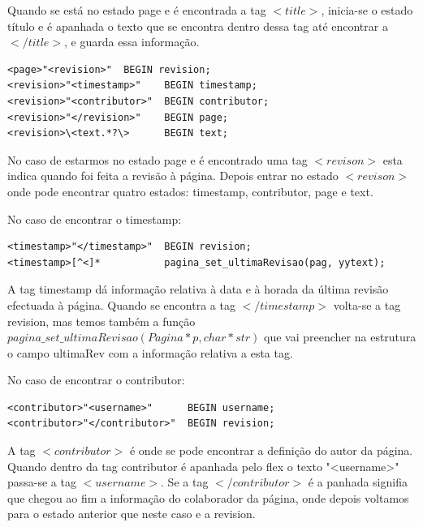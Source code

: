 \documentclass[11pt, a4paper, oneside]{article}
\begin{document}
Quando se está no estado page e é encontrada a tag \begin{math}<title>\end{math}, inicia-se o estado título e é apanhada o texto que se encontra dentro dessa tag até encontrar a \begin{math}</title>\end{math}, e guarda essa informação.


\begin{verbatim}
<page>"<revision>"  BEGIN revision;
<revision>"<timestamp>"    BEGIN timestamp;
<revision>"<contributor>"  BEGIN contributor;
<revision>"</revision>"    BEGIN page;
<revision>\<text.*?\>      BEGIN text;
\end{verbatim}


No caso de estarmos no estado page e é encontrado uma tag \begin{math}<revison>\end{math} esta indica quando foi feita a revisão à página. Depois entrar no estado \begin{math}<revison>\end{math} onde pode encontrar quatro estados: timestamp, contributor, page e text.

No caso de encontrar o timestamp:
\begin{verbatim}
<timestamp>"</timestamp>"  BEGIN revision;
<timestamp>[^<]*           pagina_set_ultimaRevisao(pag, yytext);
\end{verbatim}

A tag timestamp dá informação relativa à data e à horada da última revisão efectuada à página.
Quando se encontra a tag \begin{math}</timestamp>\end{math}  volta-se a tag revision, mas  temos também a função\begin{math}pagina\_set\_ultimaRevisao(Pagina* p, char* str)\end{math} que vai preencher na estrutura o campo ultimaRev com a informação relativa a esta tag.


No caso de encontrar o contributor:
\begin{verbatim}
<contributor>"<username>"      BEGIN username;
<contributor>"</contributor>"  BEGIN revision;

\end{verbatim}
A tag \begin{math}<contributor>\end{math} é onde se pode encontrar a definição do autor da página. 
Quando dentro da tag contributor é apanhada pelo flex o texto "<username>" passa-se a tag  \begin{math}<username>\end{math}.
Se a tag \begin{math}</contributor>\end{math} é a panhada signifia que chegou ao fim a informação do colaborador da página, onde depois voltamos para o estado anterior que neste caso e a revision. 
\end{document}
